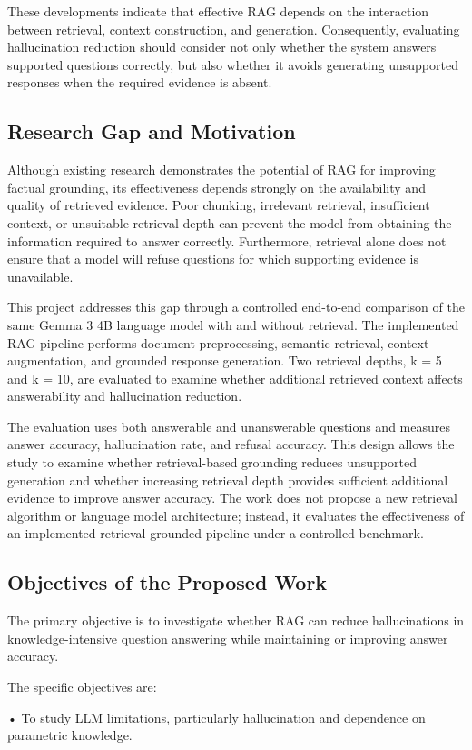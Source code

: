 \documentclass[conference]{IEEEtran}
\begin{document}
These developments indicate that effective RAG depends on the interaction between retrieval, context construction, and generation. Consequently, evaluating hallucination reduction should consider not only whether the system answers supported questions correctly, but also whether it avoids generating unsupported responses when the required evidence is absent.
\subsection{Research Gap and Motivation}
Although existing research demonstrates the potential of RAG for improving factual grounding, its effectiveness depends strongly on the availability and quality of retrieved evidence. Poor chunking, irrelevant retrieval, insufficient context, or unsuitable retrieval depth can prevent the model from obtaining the information required to answer correctly. Furthermore, retrieval alone does not ensure that a model will refuse questions for which supporting evidence is unavailable.

This project addresses this gap through a controlled end-to-end comparison of the same Gemma 3 4B language model with and without retrieval. The implemented RAG pipeline performs document preprocessing, semantic retrieval, context augmentation, and grounded response generation. Two retrieval depths, k = 5 and k = 10, are evaluated to examine whether additional retrieved context affects answerability and hallucination reduction.

The evaluation uses both answerable and unanswerable questions and measures answer accuracy, hallucination rate, and refusal accuracy. This design allows the study to examine whether retrieval-based grounding reduces unsupported generation and whether increasing retrieval depth provides sufficient additional evidence to improve answer accuracy. The work does not propose a new retrieval algorithm or language model architecture; instead, it evaluates the effectiveness of an implemented retrieval-grounded pipeline under a controlled benchmark.
\subsection{Objectives of the Proposed Work}
The primary objective is to investigate whether RAG can reduce hallucinations in knowledge-intensive question answering while maintaining or improving answer accuracy.

The specific objectives are:

• To study LLM limitations, particularly hallucination and dependence on parametric knowledge.
\end{document}
